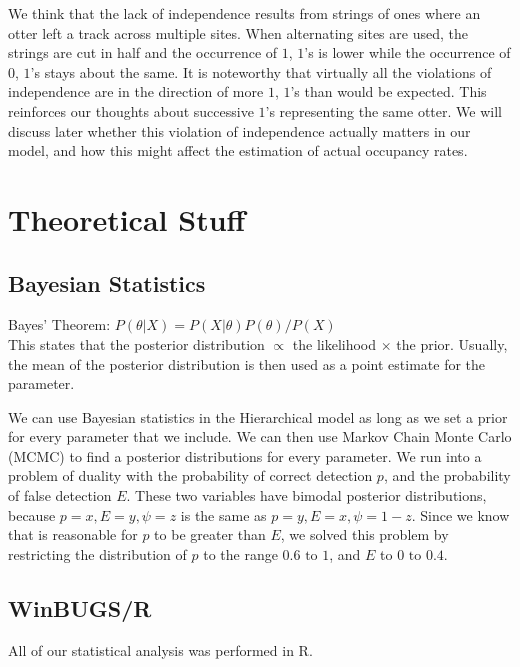 \documentclass[12pt]{article}
\begin{document}

    We think that the lack of independence results from strings of ones where an
    otter left a track across multiple sites. When alternating sites are used,
    the strings are cut in half and the occurrence of \(1\), \(1\)'s is lower
    while the occurrence of \(0\), \(1\)'s stays about the same. It is
    noteworthy that virtually all the violations of independence are in the
    direction of more \(1\), \(1\)'s than would be expected. This reinforces our
    thoughts about successive \(1\)'s representing the same otter. We will
    discuss later whether this violation of independence actually matters in our
    model, and how this might affect the estimation of actual occupancy rates.

\section{Theoretical Stuff} 

    \subsection{Bayesian Statistics}
    Bayes' Theorem: \(P(\theta|X) = P(X|\theta)P(\theta) / P(X)\) \\

    This states that the posterior distribution \(\propto\) the likelihood
    \(\times\) the prior. Usually, the mean of the posterior distribution is
    then used as a point estimate for the parameter.

    We can use Bayesian statistics in the Hierarchical model as long as we set a
    prior for every parameter that we include. We can then use Markov Chain
    Monte Carlo (MCMC) to find a posterior distributions for every parameter. We
    run into a problem of duality with the probability of correct detection
    \(p\), and the probability of false detection \(E\). These two variables
    have bimodal posterior distributions, because \(p=x,E=y,\psi=z\) is the same
    as \(p=y,E=x,\psi=1-z\). Since we know that is reasonable for \(p\) to be
    greater than \(E\), we solved this problem by restricting the distribution
    of \(p\) to the range \(0.6\text{ to }1\), and \(E\) to \(0\text{ to }0.4\).

    \subsection{WinBUGS/R}
    All of our statistical analysis was performed in R.
\end{document}
